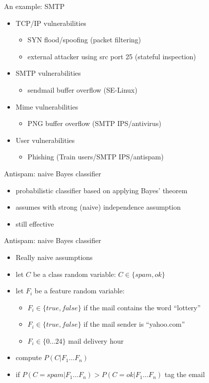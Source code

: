 \documentclass{beamer}
\begin{document}
\begin{frame}{An example: SMTP}
  \begin{itemize}
  \item TCP/IP vulnerabilities
    \begin{itemize}
    \item SYN flood/spoofing (packet filtering)
    \item external attacker using src port 25 (stateful inspection)
    \end{itemize}
  \item SMTP vulnerabilities
    \begin{itemize}
    \item sendmail buffer overflow (SE-Linux)
    \end{itemize}
  \item Mime vulnerabilities
    \begin{itemize}
    \item PNG buffer overflow (SMTP IPS/antivirus)
    \end{itemize}
  \item User vulnerabilities
    \begin{itemize}
    \item Phishing‎ (Train users/SMTP IPS/antispam)
    \end{itemize}
  \end{itemize}
\end{frame}

\begin{frame}{Antispam: naive Bayes classifier}
  \begin{itemize}
  \item probabilistic classifier based on applying Bayes' theorem
  \item assumes with strong (naive) independence assumption
  \item still effective
  \end{itemize}
\end{frame}

\begin{frame}{Antispam: naive Bayes classifier}
  \begin{itemize}
  \item \alert{Really naive assumptions}
  \item let $C$ be a class random variable: $C \in \{spam,ok\}$
  \item let $F_i$ be a feature random variable:
    \begin{itemize}
      \item $F_i \in \{true,false\}$  if the mail contains the word
        ``lottery''
      \item $F_i \in \{true,false\}$  if the mail sender is ``yahoo.com''
      \item $F_i \in \{0 \dots 24\}$  mail delivery hour
    \end{itemize}
  \item compute $P(C|F_1 \dots F_n)$
  \item if $P(C=spam|F_1 \dots F_n) > P(C=ok|F_1 \dots F_n)$ tag the email
  \end{itemize}
\end{frame}
\end{document}
